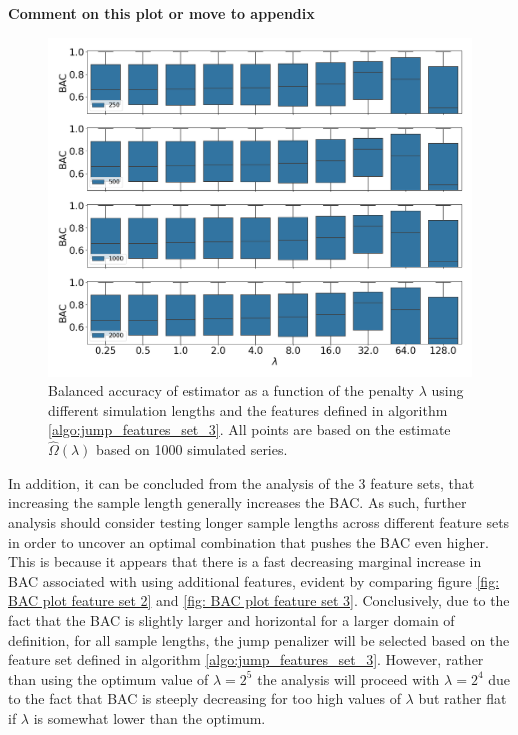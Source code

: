 \textbf{Comment on this plot or move to appendix}

\begin{figure}[H] 
    \centering
    \includegraphics[width=1\textwidth]{analysis/model_convergence/images/jump_penalties_feature_set_3_box.png}
    \caption [Boxplot of BAC for \jump using feature set 3]{Balanced accuracy of \jump estimator as a function of the penalty $\lambda$ using different simulation lengths and the features defined in algorithm \ref{algo:jump_features_set_3}. All points are based on the estimate $\hat{\Omega} (\lambda)$ based on 1000 simulated series.}
    \label{fig: BAC plot feature set 3 box}
\end{figure}

In addition, it can be concluded from the analysis of the 3 feature sets, that increasing the sample length generally increases the BAC. As such, further analysis should consider testing longer sample lengths across different feature sets in order to uncover an optimal combination that pushes the BAC even higher. This is because it appears that there is a fast decreasing marginal increase in BAC associated with using additional features, evident by comparing figure \ref{fig: BAC plot feature set 2} and \ref{fig: BAC plot feature set 3}. Conclusively, due to the fact that the BAC is slightly larger and horizontal for a larger domain of definition, for all sample lengths, the jump penalizer will be selected based on the feature set defined in algorithm \ref{algo:jump_features_set_3}. However, rather than using the optimum value of $\lambda=2^5$ the analysis will proceed with $\lambda=2^4$ due to the fact that BAC is steeply decreasing for too high values of $\lambda$ but rather flat if $\lambda$ is somewhat lower than the optimum.

